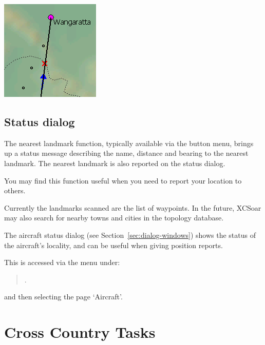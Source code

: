 \documentclass[a4paper,12pt]{refrep}
\begin{document}
\begin{center}
\includegraphics[angle=0,width=0.6\linewidth,keepaspectratio='true']{figures/cut-fgtt.png}
%
%
\end{center}

\section{Status dialog}\label{sec:aircr-stat-dial}

The nearest landmark function, typically available via the button
menu, brings up a status message describing the name, distance and
bearing to the nearest landmark.  The nearest landmark is also
reported on the status dialog.

You may find this function useful when you need to report your
location to others.

Currently the landmarks scanned are the list of waypoints.  In the
future, XCSoar may also search for nearby towns and cities in the
topology database.

The aircraft status dialog (see Section~\ref{sec:dialog-windows})
shows the status of the aircraft's locality, and can be useful when
giving position reports.

This is accessed via the menu under: 
\begin{quote}
\blink{}.
\end{quote}
and then selecting the page `Aircraft'.

\chapter{Cross Country Tasks}\label{cha:tasks}
\end{document}
